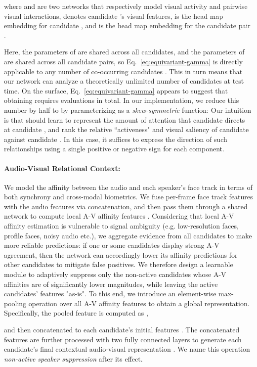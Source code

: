 \documentclass[sigconf]{acmart}
\begin{document}
\begin{CCSXML}
where  and  are two networks that respectively model visual activity and pairwise visual interactions,  denotes candidate 's visual features,  is the head map embedding for candidate , and  is the head map embedding for the candidate pair .

Here, the parameters of  are shared across all candidates, and the parameters of  are shared across all candidate pairs, so Eq.~\eqref{eq:equivariant-gamma} is directly applicable to any number of co-occurring candidates . This in turn means that our network can analyze a theoretically unlimited number of candidates at test time. On the surface, Eq.~\eqref{eq:equivariant-gamma} appears to suggest that obtaining  requires  evaluations in total. In our implementation, we reduce this number by half to  by parameterizing  as a \textit{skew-symmetric} function:
Our intuition is that  should learn to represent the amount of attention that candidate  directs at candidate , and rank the relative ``activeness" and visual saliency of candidate  against candidate . In this case, it suffices to express the direction of such relationships using a single positive or negative sign for each component.
\vspace{-1.5ex}
\paragraph{Audio-Visual Relational Context:}
We model the affinity between the audio and each speaker's face track in terms of both synchrony and cross-modal biometrics. We fuse per-frame face track features with the audio features via concatenation, and then pass them through a shared network  to compute local A-V affinity features . Considering that local A-V affinity estimation is vulnerable to signal ambiguity (e.g. low-resolution faces, profile faces, noisy audio etc.), we aggregate evidence from all candidates to make more reliable predictions: if one or some candidates display strong A-V agreement, then the network can accordingly lower its affinity predictions for other candidates to mitigate false positives. We therefore design a learnable module to adaptively suppress only the non-active candidates whose A-V affinities are of significantly lower magnitudes, while leaving the active candidates' features "as-is". To this end, we introduce an element-wise max-pooling operation over all A-V affinity features to obtain a global representation. Specifically, the pooled feature is computed as , 
\iffalse

\fi
and then concatenated to each candidate's initial features . The concatenated features are further processed with two fully connected layers to generate each candidate's final contextual audio-visual representation . We name this operation \textit{non-active speaker suppression} after its effect.
\vspace{-2ex}

\end{CCSXML}
\end{document}
